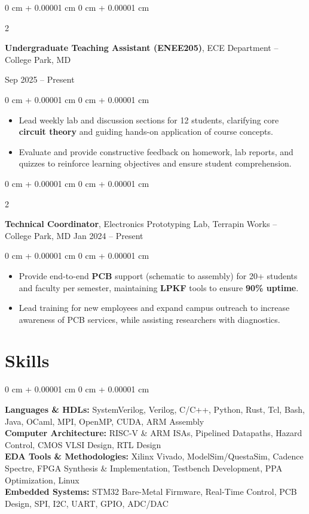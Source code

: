 \documentclass[10pt, letterpaper]{article}
\newenvironment{highlights}{
    \begin{itemize}[
        topsep=0.05 cm,
        parsep=0.05 cm,
        partopsep=0pt,
        itemsep=0pt,
        leftmargin=0 cm + 10pt
    ]
}{
    \end{itemize}
}
\newenvironment{onecolentry}{
    \begin{adjustwidth}{
        0 cm + 0.00001 cm
    }{
        0 cm + 0.00001 cm
    }
}{
    \end{adjustwidth}
}
\newenvironment{twocolentry}[2][]{
    \onecolentry
    \def\secondColumn{#2}
    \setcolumnwidth{\fill, 4.5 cm}
    \begin{paracol}{2}
}{
    \switchcolumn \raggedleft \secondColumn
    \end{paracol}
    \endonecolentry
}
\begin{document}
        \vspace{0.10 cm}
        
        \begin{twocolentry}{
            Sep 2025 – Present
        }
            \textbf{Undergraduate Teaching Assistant (ENEE205)}, ECE Department -- College Park, MD
        \end{twocolentry}
        \vspace{0.05 cm}
        \begin{onecolentry}
            \begin{highlights}
                \item Lead weekly lab and discussion sections for 12 students, clarifying core \textbf{circuit theory} and guiding hands-on application of course concepts.
                \item Evaluate and provide constructive feedback on homework, lab reports, and quizzes to reinforce learning objectives and ensure student comprehension.
            \end{highlights}
        \end{onecolentry}
        
        \vspace{0.10 cm}

        \begin{twocolentry}{
            Jan 2024 – Present
        }
            \textbf{Technical Coordinator}, Electronics Prototyping Lab, Terrapin Works -- College Park, MD \end{twocolentry}
        \vspace{0.05 cm}
        \begin{onecolentry}
            \begin{highlights}
                \item Provide end-to-end \textbf{PCB} support (schematic to assembly) for 20+ students and faculty per semester, maintaining \textbf{LPKF} tools to ensure \textbf{90\% uptime}.
                \item Lead training for new employees and expand campus outreach to increase awareness of PCB services, while assisting researchers with diagnostics.
            \end{highlights}
        \end{onecolentry}
    \section{Skills}
        \begin{onecolentry}
            \textbf{Languages \& HDLs:} SystemVerilog, Verilog, C/C++, Python, Rust, Tcl, Bash, Java, OCaml, MPI, OpenMP, CUDA, ARM Assembly \\
            \textbf{Computer Architecture:} RISC-V \& ARM ISAs, Pipelined Datapaths, Hazard Control, CMOS VLSI Design, RTL Design \\
            \textbf{EDA Tools \& Methodologies:} Xilinx Vivado, ModelSim/QuestaSim, Cadence Spectre, FPGA Synthesis \& Implementation, Testbench Development, PPA Optimization, Linux \\
            \textbf{Embedded Systems:} STM32 Bare-Metal Firmware, Real-Time Control, PCB Design, SPI, I2C, UART, GPIO, ADC/DAC
        \end{onecolentry}
\end{document}
